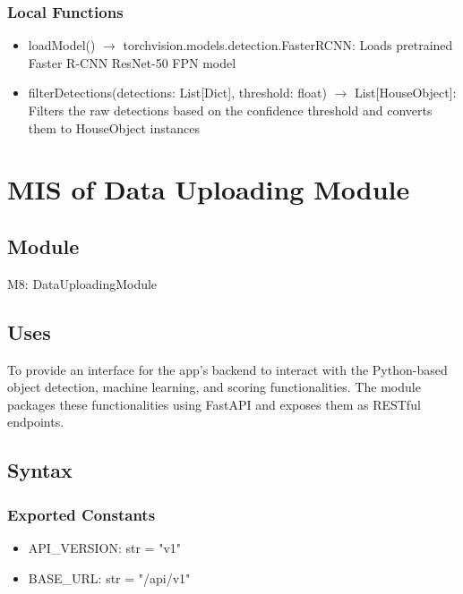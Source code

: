 \documentclass[12pt, titlepage]{article}
\begin{document}
\subsubsection{Local Functions}

\begin{itemize}
  \item loadModel() $\rightarrow$ torchvision.models.detection.FasterRCNN: Loads pretrained Faster R-CNN ResNet-50 FPN model
  \item filterDetections(detections: List[Dict], threshold: float) $\rightarrow$ List[HouseObject]: Filters the raw detections based on the confidence threshold and converts them to HouseObject instances
\end{itemize}

\newpage

\section{MIS of Data Uploading Module} \label{Module} 

\subsection{Module}

M8: DataUploadingModule

\subsection{Uses}
To provide an interface for the app's backend to interact with the Python-based object detection, machine learning, and scoring functionalities. The module packages these functionalities using FastAPI and exposes them as RESTful endpoints.

\subsection{Syntax}

\subsubsection{Exported Constants}

\begin{itemize}
  \item API{\_}VERSION: str = "v1"
  \item BASE{\_}URL: str = "/api/v1"
\end{itemize}
\end{document}
